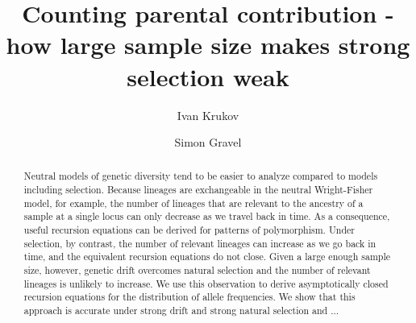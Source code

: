 \documentclass[review]{elsarticle}
\begin{document}
\begin{frontmatter}
  \title{Counting parental contribution - how large sample size makes strong selection weak}

  \author{Ivan Krukov}
  \author{Simon Gravel}

  \begin{abstract}
    Neutral models of genetic diversity tend to be easier to analyze compared to models including
     selection. Because lineages are exchangeable in the neutral Wright-Fisher model, 
     for example, the number of lineages that are relevant to the ancestry of a sample at a single locus 
     can only decrease as we travel back in time.   
    As a consequence, useful recursion equations can be derived for patterns of polymorphism.  
    Under selection, by contrast, the number of relevant lineages can increase as we go back in time, 
    and the equivalent recursion equations do not close.
    Given a large enough sample size, however, genetic drift overcomes natural selection and the 
    number of relevant lineages is unlikely to increase.
    We use this observation to derive asymptotically closed recursion equations for the distribution of 
    allele frequencies. 
    We show that this approach is accurate under strong drift and strong natural selection and ... 
    
    
    
     
  \end{abstract}
\end{frontmatter}
\end{document}
